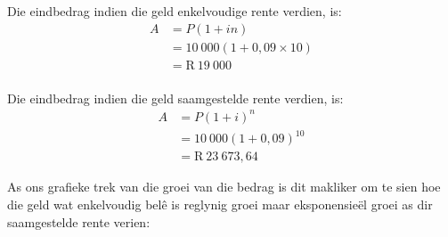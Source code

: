 Die eindbedrag indien die geld enkelvoudige rente verdien, is:
\begin{align*}
    A &= P(1 + in)\\
      &= 10~000(1 + 0,09 \times 10)\\
      &= \mbox{R}~19~000\\
\end{align*}

Die eindbedrag indien die geld saamgestelde rente verdien, is:
\begin{align*}
    A &= P(1 + i)^n\\
      &= 10~000(1 + 0,09)^10\\
      &= \mbox{R}~23~673,64
\end{align*}

As ons grafieke trek van die groei van die bedrag is dit makliker om te sien hoe die geld wat enkelvoudig bel\^e is reglynig groei maar eksponensie\"el groei as dir saamgestelde rente verien:

\begin{figure}[H]
    \begin{center}
	\label{FG:fig:SI10}
    \end{center}
\end{figure}


